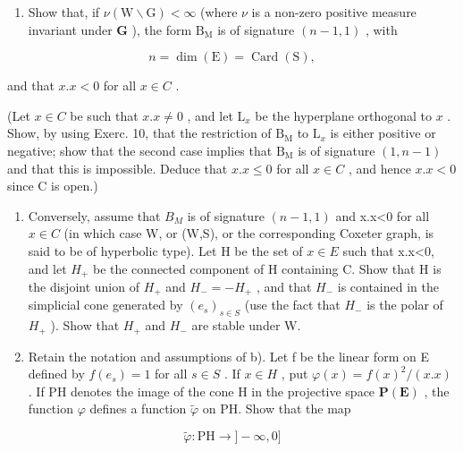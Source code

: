 \begin{enumerate}
\def\labelenumi{\alph{enumi})}
\tightlist
\item
  Show that, if \(\nu (\mathrm{W}\backslash \mathrm{G}) < \infty\) (where \(\nu\) is a non-zero positive measure invariant under \(\mathbf{G}\) ), the form \(\mathrm{B_M}\) is of signature \((n - 1,1)\) , with
\end{enumerate}

\[
n = \dim (\mathrm{E}) = \operatorname{Card} (\mathrm{S}),
\]

and that \(x.x < 0\) for all \(x \in C\) .

(Let \(x \in C\) be such that \(x.x \neq 0\) , and let \(\mathrm{L}_x\) be the hyperplane orthogonal to \(x\) . Show, by using Exerc. 10, that the restriction of \(\mathrm{B}_{\mathrm{M}}\) to \(\mathrm{L}_x\) is either positive or negative; show that the second case implies that \(\mathrm{B}_{\mathrm{M}}\) is of signature \((1, n - 1)\) and that this is impossible. Deduce that \(x.x \leqslant 0\) for all \(x \in C\) , and hence \(x.x < 0\) since C is open.)

\begin{enumerate}
\def\labelenumi{\alph{enumi})}
\setcounter{enumi}{1}
\item
  Conversely, assume that \(B_{M}\) is of signature \((n-1,1)\) and x.x\textless0 for all \(x\in C\) (in which case W, or (W,S), or the corresponding Coxeter graph, is said to be of hyperbolic type). Let H be the set of \(x\in E\) such that x.x\textless0, and let \(H_{+}\) be the connected component of H containing C. Show that H is the disjoint union of \(H_{+}\) and \(H_{-}=-H_{+}\) , and that \(H_{-}\) is contained in the simplicial cone generated by \((e_{s})_{s\in S}\) (use the fact that \(H_{-}\) is the polar of \(H_{+}\) ). Show that \(H_{+}\) and \(H_{-}\) are stable under W.
\item
  Retain the notation and assumptions of b). Let f be the linear form on E defined by \(f(e_{s}) = 1\) for all \(s \in S\) . If \(x \in H\) , put \(\varphi(x) = f(x)^{2}/(x.x)\) . If PH denotes the image of the cone H in the projective space \(\mathbf{P}(\mathbf{E})\) , the function \(\varphi\) defines a function \(\tilde{\varphi}\) on PH. Show that the map
\end{enumerate}

\[
\left. \tilde {\varphi}: \mathrm{PH} \rightarrow ] - \infty , 0 ] \right.
\]

